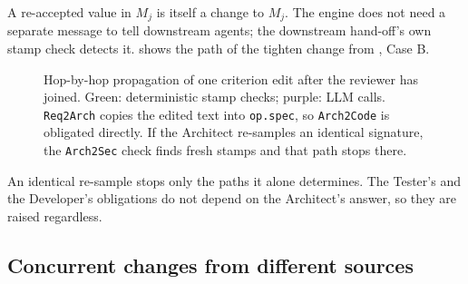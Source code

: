 \documentclass[10pt,a4paper]{article}
\newcommand{\code}[1]{\texttt{#1}}
\theoremstyle{definition}
\begin{document}
A re-accepted value in $M_j$ is itself a change to $M_j$. The engine does not
need a separate message to tell downstream agents; the downstream hand-off's
own stamp check detects it.  shows the path of the
tighten change from , Case B.

\begin{figure}[h]
\centering
{}
\caption{Hop-by-hop propagation of one criterion edit after the reviewer has
joined. Green: deterministic stamp checks; purple: LLM calls. \code{Req2Arch}
copies the edited text into \code{op.spec}, so \code{Arch2Code} is obligated
directly. If the Architect re-samples an identical signature, the
\code{Arch2Sec} check finds fresh stamps and that path stops there.}
\label{fig:cascade}
\end{figure}

An identical re-sample stops only the paths it alone determines. The
Tester's and the Developer's obligations do not depend on the Architect's
answer, so they are raised regardless.

\subsection{Concurrent changes from different sources}
\end{document}
